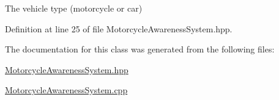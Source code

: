 The vehicle type (motorcycle or car) 



Definition at line 25 of file Motorcycle\-Awareness\-System.\-hpp.



The documentation for this class was generated from the following files\-:\begin{DoxyCompactItemize}
\item 
\hyperlink{MotorcycleAwarenessSystem_8hpp}{Motorcycle\-Awareness\-System.\-hpp}\item 
\hyperlink{MotorcycleAwarenessSystem_8cpp}{Motorcycle\-Awareness\-System.\-cpp}\end{DoxyCompactItemize}
